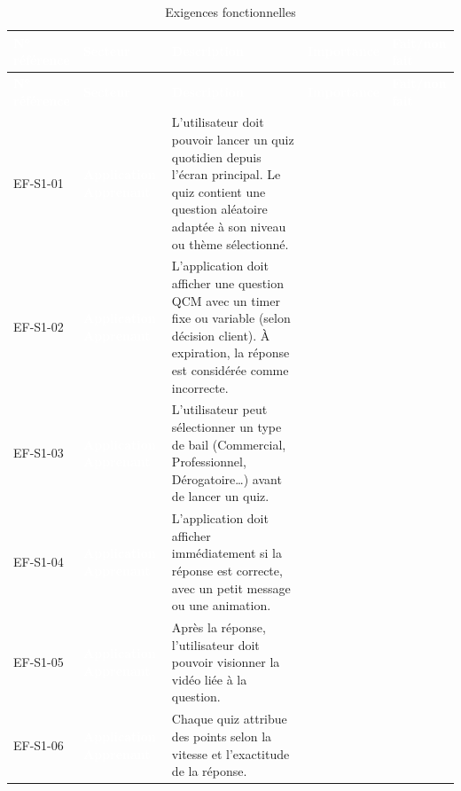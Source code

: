 
\begingroup
\scriptsize
\setlength{\tabcolsep}{3pt}
\renewcommand{\arraystretch}{1.28}
\begin{longtable}{|P{1.75cm}|P{2.65cm}|P{7.45cm}|P{1.80cm}|P{1.55cm}|}
\caption{Exigences fonctionnelles}\\
\hline
{}
\textcolor{white}{\textbf{N° référence}} & \textcolor{white}{\textbf{Secteur}} & \textcolor{white}{\textbf{Description}} & \textcolor{white}{\textbf{Importance}} & \textcolor{white}{\textbf{Fait/non fait}} \\ \hline
\endfirsthead
\hline
{}
\textcolor{white}{\textbf{N° référence}} & \textcolor{white}{\textbf{Secteur}} & \textcolor{white}{\textbf{Description}} & \textcolor{white}{\textbf{Importance}} & \textcolor{white}{\textbf{Fait/non fait}} \\ \hline
\endhead
EF-S1-01 & \textcolor{white}{\textbf{Application Apprenant}} & L’utilisateur doit pouvoir lancer un quiz quotidien depuis l’écran principal. Le quiz contient une question aléatoire adaptée à son niveau ou thème sélectionné. &  &  \\ \hline
EF-S1-02 & \textcolor{white}{\textbf{Application Apprenant}} & L’application doit afficher une question QCM avec un timer fixe ou variable (selon décision client). À expiration, la réponse est considérée comme incorrecte. &  &  \\ \hline
EF-S1-03 & \textcolor{white}{\textbf{Application Apprenant}} & L’utilisateur peut sélectionner un type de bail (Commercial, Professionnel, Dérogatoire…) avant de lancer un quiz. &  &  \\ \hline
EF-S1-04 & \textcolor{white}{\textbf{Application Apprenant}} & L’application doit afficher immédiatement si la réponse est correcte, avec un petit message ou une animation. &  &  \\ \hline
EF-S1-05 & \textcolor{white}{\textbf{Application Apprenant}} & Après la réponse, l’utilisateur doit pouvoir visionner la vidéo liée à la question. &  &  \\ \hline
EF-S1-06 & \textcolor{white}{\textbf{Application Apprenant}} & Chaque quiz attribue des points selon la vitesse et l’exactitude de la réponse. &  &  \\ \hline

\end{longtable}
